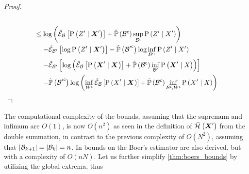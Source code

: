\begin{proof}
\begin{align}
\begin{split}
		\end{split}\\
		\begin{split}
			&\leq\log\left(\partialestimator{\probcond{\observations{}^\prime}{\statesRV{}^\prime}}{\subSpace}+\estimatedmeasure{\stcomp{\subSpace}}\sup_{\stcomp{\subSpace}}\probcond{\observations{}^\prime}{\states{}^\prime}\right)\\
			&\phantomeq-\partialestimator{\log\probcond{\observations{}^\prime}{\statesRV{}^\prime}}{\subSpace^\prime}-\estimatedmeasure{\stcomp{\subSpace^\prime}}\log\inf_{\stcomp{\subSpace^\prime}}\probcond{\observations{}^\prime}{\states{}^\prime}\\
			&\phantomeq-\partialestimator{\log\left(\partialestimator{\probcond{\statesRV{}^\prime}{\statesRV{}}}{\subSpace}+\estimatedmeasure{\stcomp{\subSpace}}\inf_{\stcomp{\subSpace}}\probcond{\statesRV{}^\prime}{\states{}}\right)}{\subSpace^\prime}\\
			&\phantomeq-\estimatedmeasure{\stcomp{\subSpace^\prime}}\log\left(\inf_{\stcomp{\subSpace^\prime}}\partialestimator{\probcond{\states{}^\prime}{\statesRV{}}}{\subSpace}+\estimatedmeasure{\stcomp{\subSpace}}\inf_{\stcomp{\subSpace},\stcomp{\subSpace^\prime}}\probcond{\states{}^\prime}{\states{}}\right)
		\end{split}
	\end{align}
\end{proof}

The computational complexity of the bounds, assuming that the supremum and infimum are $O(1)$, is now $O(n^2)$ as seen in the definition of $\bar{\mathcal{H}}_{}\left({\boldsymbol X_{}^\prime}\right)$ from the double summation, in contrast to the previous complexity of $O(N^2)$, assuming that $\lvert\mathcal{B}_{k+1}\rvert=\lvert\mathcal{B}_{k}\rvert=n$. In \cite{Sztyglic22iros} bounds on the Boer's estimator are also derived, but with a complexity of $O(nN)$. Let us further simplify \cref{thm:boers_bounds} by utilizing the global extrema, thus

